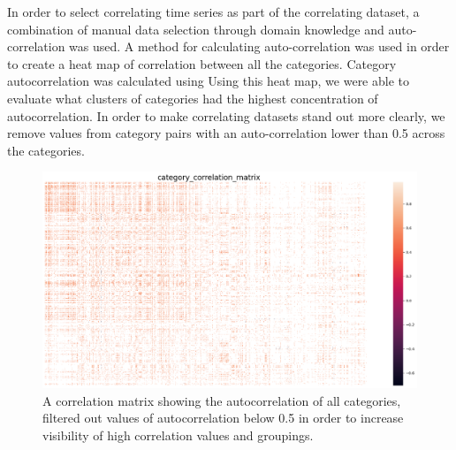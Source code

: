 In order to select correlating time series as part of the correlating dataset, a combination of manual data selection through domain knowledge and auto-correlation was used.
A method for calculating auto-correlation was used in order to create a heat map of correlation between all the categories.
Category autocorrelation was calculated using 
Using this heat map, we were able to evaluate what clusters of categories had the highest concentration of autocorrelation.
In order to make correlating datasets stand out more clearly, we remove values from category pairs with an auto-correlation lower than 0.5 across the categories. 
\begin{figure}[h!]
  \centering
  \includegraphics[width=\textwidth]{./figs/dataset/category_correlation_matrix.png}
  \hfill
  \caption{A correlation matrix showing the autocorrelation of all categories, filtered out values of autocorrelation below 0.5 in order to increase visibility of high correlation values and groupings.}
  \label{fig:dataset:heatmap_correlating}
\end{figure}

